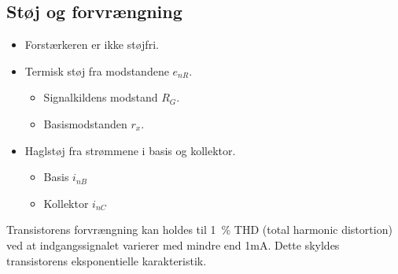 \documentclass[danish]{article}
\begin{document}
\subsection{Støj og forvrængning}
\begin{itemize}
	\item Forstærkeren er ikke støjfri.
	\item Termisk støj fra modstandene $e_{nR}$.
	\begin{itemize}
		\item Signalkildens modstand $R_G$.
		\item Basismodstanden $r_x$.
	\end{itemize}
	\item Haglstøj fra strømmene i basis og kollektor.
	\begin{itemize}
		\item Basis $i_{nB}$
		\item Kollektor $i_{nC}$
	\end{itemize}
\end{itemize}

Transistorens forvrængning kan holdes til \SI{1}{\percent} THD (total harmonic distortion) ved at indgangssignalet varierer med mindre end 1mA. Dette skyldes transistorens eksponentielle karakteristik.
\end{document}
